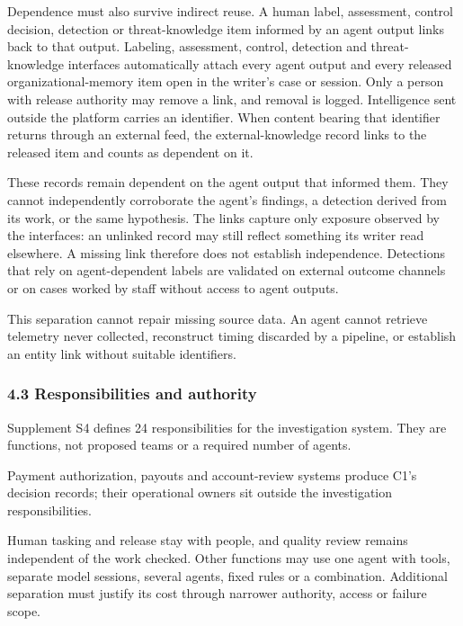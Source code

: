 \documentclass[
  11pt,
]{article}
\begin{document}
Dependence must also survive indirect reuse. A human label, assessment,
control decision, detection or threat-knowledge item informed by an
agent output links back to that output. Labeling, assessment, control,
detection and threat-knowledge interfaces automatically attach every
agent output and every released organizational-memory item open in the
writer's case or session. Only a person with release authority may
remove a link, and removal is logged. Intelligence sent outside the
platform carries an identifier. When content bearing that identifier
returns through an external feed, the external-knowledge record links to
the released item and counts as dependent on it.

These records remain dependent on the agent output that informed them.
They cannot independently corroborate the agent's findings, a detection
derived from its work, or the same hypothesis. The links capture only
exposure observed by the interfaces: an unlinked record may still
reflect something its writer read elsewhere. A missing link therefore
does not establish independence. Detections that rely on agent-dependent
labels are validated on external outcome channels or on cases worked by
staff without access to agent outputs.

This separation cannot repair missing source data. An agent cannot
retrieve telemetry never collected, reconstruct timing discarded by a
pipeline, or establish an entity link without suitable identifiers.

\hypertarget{responsibilities-and-authority}{%
\subsubsection{4.3 Responsibilities and
authority}\label{responsibilities-and-authority}}

Supplement S4 defines 24 responsibilities for the investigation system.
They are functions, not proposed teams or a required number of agents.

Payment authorization, payouts and account-review systems produce C1's
decision records; their operational owners sit outside the investigation
responsibilities.

Human tasking and release stay with people, and quality review remains
independent of the work checked. Other functions may use one agent with
tools, separate model sessions, several agents, fixed rules or a
combination. Additional separation must justify its cost through
narrower authority, access or failure scope.
\end{document}
